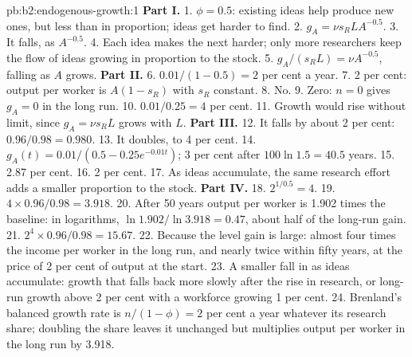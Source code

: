 \begin{solution}{pb:b2:endogenous-growth:1}
\textbf{Part I.}
1. $\phi = 0.5$: existing ideas help produce new ones, but less than in proportion; ideas get harder to find.
2. $g_A = \nu s_RLA^{-0.5}$.
3. It falls, as $A^{-0.5}$.
4. Each idea makes the next harder; only more researchers keep the flow of ideas growing in proportion to the stock.
5. $g_A/(s_RL) = \nu A^{-0.5}$, falling as $A$ grows.
\textbf{Part II.}
6. $0.01/(1 - 0.5) = 2$ per cent a year.
7. 2 per cent: output per worker is $A(1 - s_R)$ with $s_R$ constant.
8. No.
9. Zero: $n = 0$ gives $g_A = 0$ in the long run.
10. $0.01/0.25 = 4$ per cent.
11. Growth would rise without limit, since $g_A = \nu s_RL$ grows with $L$.
\textbf{Part III.}
12. It falls by about 2 per cent: $0.96/0.98 = 0.980$.
13. It doubles, to 4 per cent.
14. $g_A(t) = 0.01/(0.5 - 0.25e^{-0.01t})$; 3 per cent after $100\ln 1.5 = 40.5$ years.
15. 2.87 per cent.
16. 2 per cent.
17. As ideas accumulate, the same research effort adds a smaller proportion to the stock.
\textbf{Part IV.}
18. $2^{1/0.5} = 4$.
19. $4 \times 0.96/0.98 = 3.918$.
20. After 50 years output per worker is 1.902 times the baseline: in logarithms, $\ln 1.902/\ln 3.918 = 0.47$, about half of the long-run gain.
21. $2^4 \times 0.96/0.98 = 15.67$.
22. Because the level gain is large: almost four times the income per worker in the long run, and nearly twice within fifty
years, at the price of 2 per cent of output at the start.
23. A smaller fall in  as ideas accumulate: growth that falls back more slowly after the rise in
research, or long-run growth above 2 per cent with a workforce growing 1 per cent.
24. Brenland's balanced growth rate is $n/(1 - \phi) = 2$ per cent a year whatever its research share; doubling the share leaves it unchanged but multiplies
output per worker in the long run by 3.918.
\end{solution}
